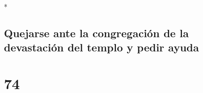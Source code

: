 \begin{paracol}{2}
\begin{otherlanguage}{english}
\end{otherlanguage}

\switchcolumn[0]*

\hypertarget{quejarse-ante-la-congregaciuxf3n-de-la-devastaciuxf3n-del-templo-y-pedir-ayuda}{%
\subsection{Quejarse ante la congregación de la devastación del templo y
pedir
ayuda}\label{quejarse-ante-la-congregaciuxf3n-de-la-devastaciuxf3n-del-templo-y-pedir-ayuda}}

\hypertarget{section-146}{%
\section{74}\label{section-146}}


\end{paracol}
